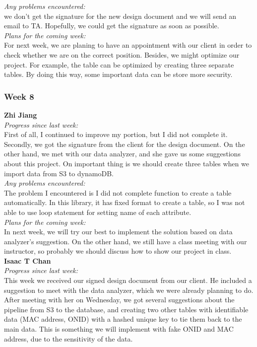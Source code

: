 \noindent\textit{Any problems encountered:}\\
we don't get the signature for the new design document and we will send an email to TA. Hopefully, we could get the signature as soon as possible.\\

\noindent\textit{Plans for the coming week:}\\
For next week, we are planing to have an appointment with our client in order to check whether we are on the correct position. Besides, we might optimize our project. For example, the table can be optimized by creating three separate tables. By doing this way, some important data can be store more security.\\

\subsubsection{Week 8}
\textbf{Zhi Jiang}\\
\noindent\textit{Progress since last week:}\\
First of all, I continued to improve my portion, but I did not complete it. Secondly, we got the signature from the client for the design document. On the other hand, we met with our data analyzer, and she gave us some suggestions about this project. On important thing is we should create three tables when we import data from S3 to dynamoDB.\\

\noindent\textit{Any problems encountered:}\\
The problem I encountered is I did not complete function to create a table automatically. In this library, it has fixed format to create a table, so I was not able to use loop statement for setting name of each attribute.\\

\noindent\textit{Plans for the coming week:}\\
In next week, we will try our best to implement the solution based on data analyzer's suggestion. On the other hand, we still have a class meeting with our instructor, so probably we should discuss how to show our project in class.\\

\noindent\textbf{Isaac T Chan}\\
\noindent\textit{Progress since last week:}\\
This week we received our signed design document from our client. He included a suggestion to meet with the data analyzer, which we were already planning to do. After meeting with her on Wednesday, we got several suggestions about the pipeline from S3 to the database, and creating two other tables with identifiable data (MAC address, ONID) with a hashed unique key to tie them back to the main data. This is something we will implement with fake ONID and MAC address, due to the sensitivity of the data.\\

